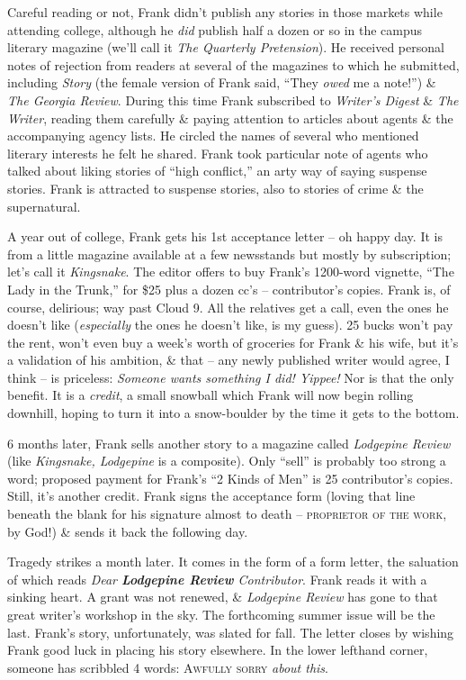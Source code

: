 \documentclass{article}
\numberwithin{equation}{section}
\begin{document}
Careful reading or not, Frank didn't publish any stories in those markets while attending college, although he \textit{did} publish half a dozen or so in the campus literary magazine (we'll call it \textit{The Quarterly Pretension}). He received personal notes of rejection from readers at several of the magazines to which he submitted, including \textit{Story} (the female version of Frank said, ``They \textit{owed} me a note!'') \& \textit{The Georgia Review}. During this time Frank subscribed to \textit{Writer's Digest} \& \textit{The Writer}, reading them carefully \& paying attention to articles about agents \& the accompanying agency lists. He circled the names of several who mentioned literary interests he felt he shared. Frank took particular note of agents who talked about liking stories of ``high conflict,'' an arty way of saying suspense stories. Frank is attracted to suspense stories, also to stories of crime \& the supernatural.

A year out of college, Frank gets his 1st acceptance letter -- oh happy day. It is from a little magazine available at a few newsstands but mostly by subscription; let's call it \textit{Kingsnake}. The editor offers to buy Frank's 1200-word vignette, ``The Lady in the Trunk,'' for \$25 plus a dozen cc's -- contributor's copies. Frank is, of course, delirious; way past Cloud 9. All the relatives get a call, even the ones he doesn't like (\textit{especially} the ones he doesn't like, is my guess). 25 bucks won't pay the rent, won't even buy a week's worth of groceries for Frank \& his wife, but it's a validation of his ambition, \& that -- any newly published writer would agree, I think -- is priceless: \textit{Someone wants something I did! Yippee!} Nor is that the only benefit. It is a \textit{credit}, a small snowball which Frank will now begin rolling downhill, hoping to turn it into a snow-boulder by the time it gets to the bottom.

6 months later, Frank sells another story to a magazine called \textit{Lodgepine Review} (like \textit{Kingsnake, Lodgepine} is a composite). Only ``sell'' is probably too strong a word; proposed payment for Frank's ``2 Kinds of Men'' is 25 contributor's copies. Still, it's another credit. Frank signs the acceptance form (loving that line beneath the blank for his signature almost to death -- \textsc{proprietor of the work}, by God!) \& sends it back the following day.

Tragedy strikes a month later. It comes in the form of a form letter, the saluation of which reads \textit{Dear \textbf{Lodgepine Review} Contributor}. Frank reads it with a sinking heart. A grant was not renewed, \& \textit{Lodgepine Review} has gone to that great writer's workshop in the sky. The forthcoming summer issue will be the last. Frank's story, unfortunately, was slated for fall. The letter closes by wishing Frank good luck in placing his story elsewhere. In the lower lefthand corner, someone has scribbled 4 words: \textsc{Awfully sorry} \textit{about this}.
\end{document}
